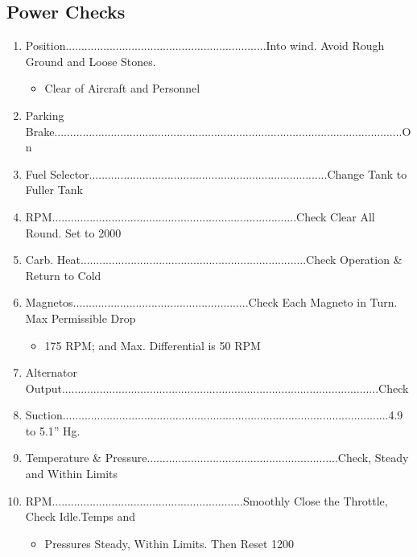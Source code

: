 \documentclass[a4paper]{article}
\newenvironment{checklist}{
  \begin{itemize}[leftmargin=*, align=left]
    \setlength{\itemsep}{2pt}
    \setlength{\parskip}{0pt}
    \setlength{\parsep}{0pt}
}{
  \end{itemize}
}
\newenvironment{numberedchecklist}{
  \begin{enumerate}[label=\arabic*., leftmargin=*, align=left]
    \setlength{\itemsep}{2pt}
    \setlength{\parskip}{0pt}
    \setlength{\parsep}{0pt}
}{
  \end{enumerate}
}
\begin{document}
\subsection*{Power Checks}
\begin{numberedchecklist}
\item Position................................................................Into wind. Avoid Rough Ground and Loose Stones.
  \begin{checklist}
  \item Clear of Aircraft and Personnel
  \end{checklist}
\item Parking Brake...............................................................................................................On
\item Fuel Selector............................................................................Change Tank to Fuller Tank
\item RPM..............................................................................Check Clear All Round. Set to 2000
\item Carb. Heat........................................................................Check Operation \& Return to Cold
\item Magnetos........................................................Check Each Magneto in Turn. Max Permissible Drop
  \begin{checklist}
  \item 175 RPM; and Max. Differential is 50 RPM
  \end{checklist}
\item Alternator Output.....................................................................................................Check
\item Suction........................................................................................................4.9 to 5.1” Hg.
\item Temperature \& Pressure.............................................................Check, Steady and Within Limits
\item RPM.............................................................Smoothly Close the Throttle, Check Idle.Temps and
  \begin{checklist}
  \item Pressures Steady, Within Limits. Then Reset 1200
  \end{checklist}
\end{numberedchecklist}
\end{document}
